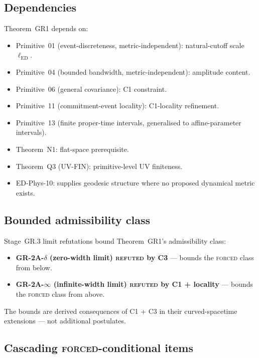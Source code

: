 \documentclass[11pt,a4paper]{article}
\begin{document}
\subsection{Dependencies}

Theorem~GR1 depends on:
\begin{itemize}
  \item Primitive~01 (event-discreteness, metric-independent): natural-cutoff scale $\ell_\mathrm{ED}$.
  \item Primitive~04 (bounded bandwidth, metric-independent): amplitude content.
  \item Primitive~06 (general covariance): C1 constraint.
  \item Primitive~11 (commitment-event locality): C1-locality refinement.
  \item Primitive~13 (finite proper-time intervals, generalised to affine-parameter intervals).
  \item Theorem~N1: flat-space prerequisite.
  \item Theorem~Q3 (UV-FIN): primitive-level UV finiteness.
  \item ED-Phys-10: supplies geodesic structure where no proposed dynamical metric exists.
\end{itemize}

\subsection{Bounded admissibility class}

Stage~GR.3 limit refutations bound Theorem~GR1's admissibility class:
\begin{itemize}
  \item \textbf{GR-2A-$\delta$ (zero-width limit) \textsc{refuted} by C3} --- bounds the \textsc{forced} class from below.
  \item \textbf{GR-2A-$\infty$ (infinite-width limit) \textsc{refuted} by C1 + locality} --- bounds the \textsc{forced} class from above.
\end{itemize}

The bounds are derived consequences of C1 + C3 in their curved-spacetime extensions --- not additional postulates.

\subsection{Cascading \textsc{forced}-conditional items}
\end{document}
